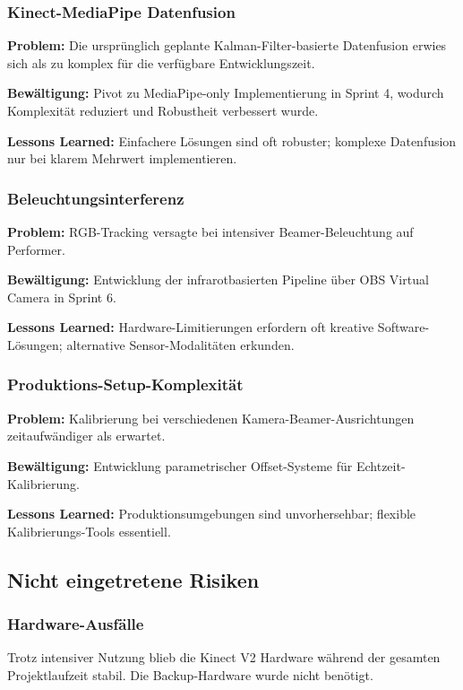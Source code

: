 \subsubsection{Kinect-MediaPipe Datenfusion}
\textbf{Problem:} Die ursprünglich geplante Kalman-Filter-basierte Datenfusion erwies sich als zu komplex für die verfügbare Entwicklungszeit.

\textbf{Bewältigung:} Pivot zu MediaPipe-only Implementierung in Sprint 4, wodurch Komplexität reduziert und Robustheit verbessert wurde.

\textbf{Lessons Learned:} Einfachere Lösungen sind oft robuster; komplexe Datenfusion nur bei klarem Mehrwert implementieren.

\subsubsection{Beleuchtungsinterferenz}
\textbf{Problem:} RGB-Tracking versagte bei intensiver Beamer-Beleuchtung auf Performer.

\textbf{Bewältigung:} Entwicklung der infrarotbasierten Pipeline über OBS Virtual Camera in Sprint 6.

\textbf{Lessons Learned:} Hardware-Limitierungen erfordern oft kreative Software-Lösungen; alternative Sensor-Modalitäten erkunden.

\subsubsection{Produktions-Setup-Komplexität}
\textbf{Problem:} Kalibrierung bei verschiedenen Kamera-Beamer-Ausrichtungen zeitaufwändiger als erwartet.

\textbf{Bewältigung:} Entwicklung parametrischer Offset-Systeme für Echtzeit-Kalibrierung.

\textbf{Lessons Learned:} Produktionsumgebungen sind unvorhersehbar; flexible Kalibrierungs-Tools essentiell.

\subsection{Nicht eingetretene Risiken}

\subsubsection{Hardware-Ausfälle}
Trotz intensiver Nutzung blieb die Kinect V2 Hardware während der gesamten Projektlaufzeit stabil. Die Backup-Hardware wurde nicht benötigt.

